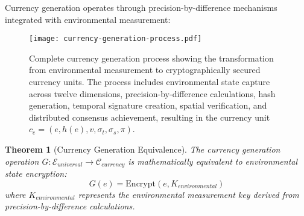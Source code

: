 \documentclass[12pt,a4paper]{article}
\newtheorem{theorem}{Theorem}
\begin{document}
Currency generation operates through precision-by-difference mechanisms integrated with environmental measurement:

\begin{figure}[H]
\centering
\texttt{[image: currency-generation-process.pdf]}
\caption{Complete currency generation process showing the transformation from environmental measurement to cryptographically secured currency units. The process includes environmental state capture across twelve dimensions, precision-by-difference calculations, hash generation, temporal signature creation, spatial verification, and distributed consensus achievement, resulting in the currency unit $c_e = (e, h(e), v, \sigma_t, \sigma_s, \pi)$.}
\label{fig:currency_generation_process}
\end{figure}

\begin{theorem}[Currency Generation Equivalence]
The currency generation operation $G: \mathcal{E}_{universal} \to \mathcal{C}_{currency}$ is mathematically equivalent to environmental state encryption:
\begin{equation}
G(e) = \text{Encrypt}(e, K_{environmental})
\end{equation}
where $K_{environmental}$ represents the environmental measurement key derived from precision-by-difference calculations.
\end{theorem}
\end{document}

